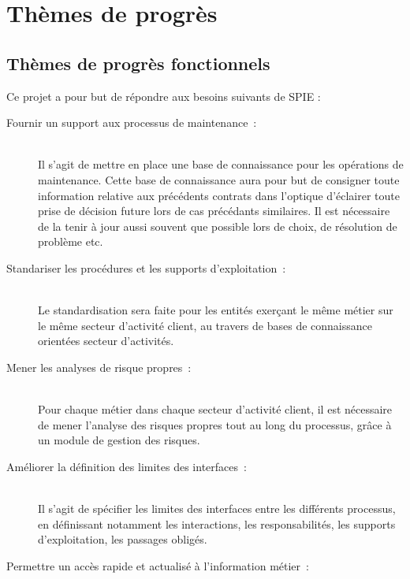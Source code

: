 \chapter{Thèmes de progrès}

\section{Thèmes de progrès fonctionnels}

Ce projet a pour but de répondre aux besoins suivants de SPIE :

\begin{description}
    \item [Fournir un support aux processus de maintenance~:] ~ \\

    Il s'agit de mettre en place une base de connaissance pour les opérations de maintenance. Cette base de connaissance aura pour but de consigner toute information relative aux précédents contrats dans l’optique d’éclairer toute prise de décision future lors de cas précédants similaires. Il est nécessaire de la tenir à jour aussi souvent que possible lors de choix, de résolution de problème etc.

    \item [Standariser les procédures et les supports d’exploitation~:] ~ \\

    Le standardisation sera faite pour les entités exerçant le même métier sur le même secteur d'activité client, au travers de bases de connaissance orientées secteur d’activités.

    \item [Mener les analyses de risque propres~:] ~ \\
    Pour chaque métier dans chaque secteur d’activité client, il est nécessaire de mener l'analyse des risques propres tout au long du processus, grâce à un module de gestion des risques.

    \item [Améliorer la définition des limites des interfaces~:] ~ \\

    Il s'agit de spécifier les limites des interfaces entre les différents processus, en définissant notamment les interactions, les responsabilités, les supports d’exploitation, les passages obligés.

    \item [Permettre un accès rapide et actualisé à l’information métier~:] ~ \\


\end{description}
